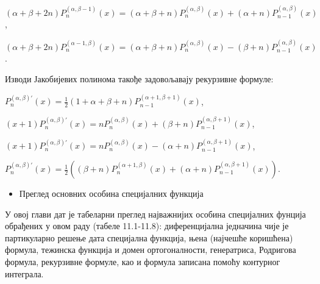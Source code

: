 \((\alpha + \beta + 2n)P_{n}^{(\alpha,\beta - 1)}(x) = (\alpha + \beta + n)P_{n}^{(\alpha,\beta)}(x) + (\alpha + n)P_{n - 1}^{(\alpha,\beta)}(x)\),

\((\alpha + \beta + 2n)P_{n}^{(\alpha - 1,\beta)}(x) = (\alpha + \beta + n)P_{n}^{(\alpha,\beta)}(x) - (\beta + n)P_{n - 1}^{(\alpha,\beta)}(x)\).

Изводи Јакобијевих полинома такође задовољавају рекурзивне формуле:

\(P_{n}^{(\alpha,\beta)'}(x) = \frac{1}{2}(1 + \alpha + \beta + n)P_{n - 1}^{(\alpha + 1,\beta + 1)}(x)\),

\((x + 1)P_{n}^{(\alpha,\beta)'}(x) = nP_{n}^{(\alpha,\beta)}(x) + (\beta + n)P_{n - 1}^{(\alpha,\beta + 1)}(x)\),

\((x + 1)P_{n}^{(\alpha,\beta)'}(x) = nP_{n}^{(\alpha,\beta)}(x) - (\alpha + n)P_{n - 1}^{(\alpha,\beta + 1)}(x)\),

\(P_{n}^{(\alpha,\beta)'}(x) = \frac{1}{2}(\overset{}{(\beta + n)}P_{n}^{(\alpha + 1,\beta)}\overset{}{(x)} + \overset{}{(\alpha + n)}P_{n - 1}^{(\alpha,\beta + 1)}\overset{}{(x)})\).

\begin{itemize}
\item
  Преглед основних особина специјалних функција
\end{itemize}

У овој глави дат је табеларни преглед најважнијих особина специјалних
фунција обрађених у овом раду (табеле 11.1-11.8): диференцијална
једначина чије је партикуларно решење дата специјална функција, њена
(најчешће коришћена) формула, тежинска функција и домен ортогоналности,
генератриса, Родригова формула, рекурзивне формуле, као и формула
записана помоћу контурног интеграла.

